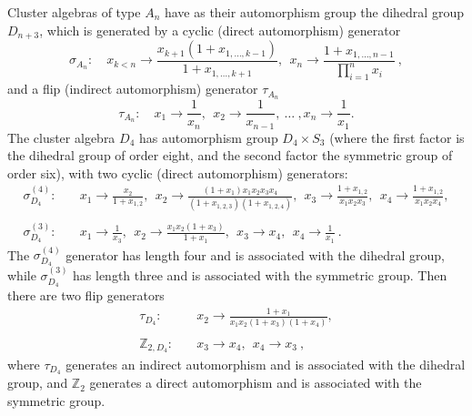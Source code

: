 \documentclass[11pt]{article}
\begin{document}
Cluster algebras of type $A_n$ have as their automorphism group the dihedral group $D_{n+3}$, which is generated by a cyclic (direct automorphism) generator 
\begin{equation}
  \sigma_{A_n}:\quad x_{k<n} \to \frac{x_{k+1}(1+x_{1,\ldots,k-1})}{1+x_{1,\ldots,k+1}},~~x_n\to\frac{1+x_{1,\ldots,n-1}}{\prod_{i=1}^n x_i} \ ,
\end{equation}
and a flip (indirect automorphism) generator $\tau_{A_n}$
\begin{equation}
  \tau_{A_n}: \quad x_1 \to \frac{1}{x_n},~~x_2 \to \frac{1}{x_{n-1}},~\ldots~,x_n\to\frac{1}{x_1}.
\end{equation}
The cluster algebra $D_4$ has automorphism group $D_4\times S_3$ (where the first factor is the dihedral group of order eight, and the second factor the symmetric group of order six), with two cyclic (direct automorphism) generators: 
\begin{equation}
\begin{split}
  \sigma^{(4)}_{D_4}:\quad& 
    x_1\to\frac{x_2}{1+x_{1,2}},~~  
    x_2\to\frac{\left(1+x_1\right)x_1 x_2 x_3 x_4}{\left(1+x_{1,2,3}\right) \left(1+x_{1,2,4}\right)},~~
    x_3\to\frac{1+x_{1,2}}{x_1 x_2 x_3},~~
    x_4\to\frac{1+x_{1,2}}{x_1 x_2 x_4},\\ \\
  \sigma^{(3)}_{D_4}:\quad& 
    x_1\to \frac{1}{x_3},~~
    x_2\to \frac{x_1 x_2 \left(1+x_3\right)}{1+x_1},~~
    x_3\to x_4,~~
    x_4\to \frac{1}{x_1} \ .
\end{split}  
\end{equation}
The $\sigma^{(4)}_{D_4}$ generator has length four and is associated with the dihedral group, while $\sigma^{(3)}_{D_4}$ has length three and is associated with the symmetric group. Then there are two flip generators
\begin{equation}
\begin{split}
  \tau_{D_4}:\quad& 
    x_2\to \frac{1+x_1}{x_1 x_2 \left(1+x_3\right) \left(1+x_4\right)},\\ \\
  \mathbb{Z}_{2,D_4}:\quad& 
    x_3\to x_4,~~
    x_4\to x_3 \ ,
\end{split}  
\end{equation}
where $\tau_{D_4}$ generates an indirect automorphism and is associated with the dihedral group, and $\mathbb{Z}_2$ generates a direct automorphism and is associated with the symmetric group.
\end{document}
